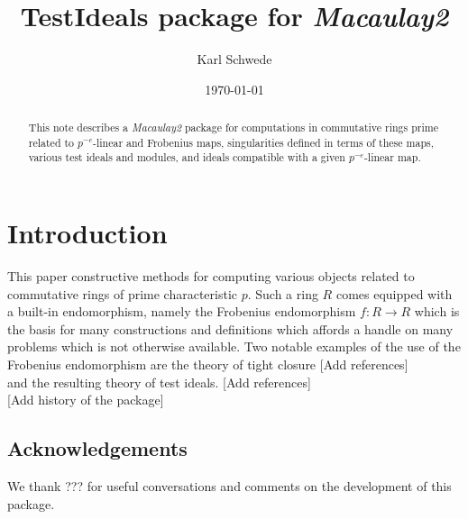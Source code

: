 \documentclass[11pt]{amsart}
\begin{document}
\title{{TestIdeals} package for \emph{Macaulay2}}
\author{Karl Schwede}
\date{\today}
\address{Department of Mathematics, University of Utah, 155 S 1400 E Room 233, Salt Lake City, UT, 84112}

\begin{abstract}
  This note describes a \emph{Macaulay2} package for computations in commutative rings prime related to $p^{-e}$-linear and Frobenius maps,
  singularities defined in terms of these maps,  various test ideals and modules, and ideals compatible with a given $p^{-e}$-linear map.
\end{abstract}




\maketitle

\section{Introduction}

This paper constructive methods for computing various objects related to commutative rings of prime characteristic $p$.
Such a ring $R$ comes equipped with a built-in endomorphism, namely the Frobenius endomorphism $f:R \rightarrow R$ which is the basis for many constructions and definitions
which affords a handle on many problems which is not otherwise available. Two notable examples of the use of the Frobenius endomorphism are the theory of tight closure {\hfill\large\color{red} [Add references]}\\
and the resulting theory of test ideals. {\hfill\large\color{red} [Add references]}\\

{\large\color{red} [Add history of the package]}

\subsection*{Acknowledgements}

We thank ??? for useful conversations and comments on the development of this package.  
\end{document}
